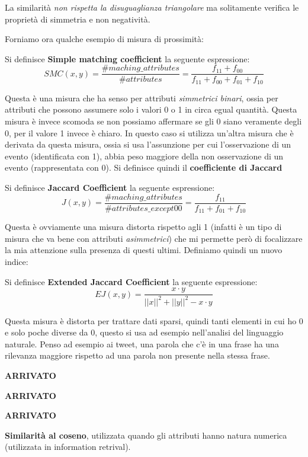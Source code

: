 La similarità \textit{non rispetta la disuguaglianza triangolare} ma solitamente verifica le proprietà di simmetria e non negatività.

Forniamo ora qualche esempio di misura di prossimità:
\begin{defn}
	 Si definisce \textbf{Simple matching coefficient} la seguente espressione: \[ SMC(x,y) = \frac{\#maching\_attributes}{\#attributes} =  \frac{f_{11}+ f_{00}}{f_{11}+ f_{00} + f_{01}+ f_{10}} \]
\end{defn}
Questa è una misura che ha senso per attributi \textit{simmetrici binari}, ossia per attributi che possono assumere solo i valori 0 o 1 in circa egual quantità.
 Questa misura è invece scomoda se non possiamo affermare se gli 0 siano veramente degli 0, per il valore 1 invece è chiaro. In questo caso si utilizza un'altra misura che è derivata da questa misura, ossia si usa l'assunzione per cui l'osservazione di un evento (identificata con 1), abbia peso maggiore della non osservazione di un evento (rappresentata con 0). Si definisce quindi il \textbf{coefficiente di Jaccard}

\begin{defn}
	Si definisce \textbf{Jaccard Coefficient} la seguente espressione:    \[ J(x,y) = \frac{\#maching\_attributes}{\#attributes\_except00} = \frac{f_{11}}{f_{11}+ f_{01}+ f_{10}}\]
\end{defn}


Questa è ovviamente una misura distorta rispetto agli 1 (infatti è un tipo di misura che va bene con attributi \textit{asimmetrici}) che mi permette però di focalizzare la mia attenzione sulla presenza di questi ultimi. 
Definiamo quindi un nuovo indice:

\begin{defn}
	Si definisce \textbf{Extended Jaccard Coefficient} la seguente espressione: \[ EJ(x,y) = \frac{x \cdot y}{||x||^2 + ||y||^2 - x \cdot y}\]
\end{defn}

 Questa misura è distorta per trattare dati sparsi, quindi tanti elementi in cui ho 0 e solo poche diverse da 0, questo si usa ad esempio nell'analisi del linguaggio naturale. Penso ad esempio ai tweet, una parola che c'è in una frase ha una rilevanza maggiore rispetto ad una parola non presente nella stessa frase.


\textbf{ARRIVATO}

\textbf{ARRIVATO}

\textbf{ARRIVATO}


\textbf{Similarit\`a al coseno}, utilizzata quando gli attributi hanno natura numerica (utilizzata in information retrival).

